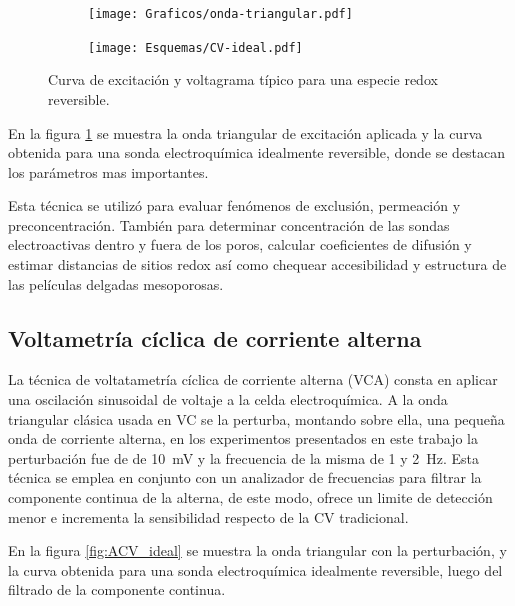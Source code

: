 	 			 \begin{figure}[h!]
			  		  \begin{subfigure}[t]{0.495\textwidth}
			  		  \texttt{[image: Graficos/onda-triangular.pdf]}
			  		  \end{subfigure}
			  		  \begin{subfigure}[t]{0.495\textwidth}
			  		  \texttt{[image: Esquemas/CV-ideal.pdf]}
			  		  \end{subfigure}
			  		  \caption[Voltamperometria ideal reversible]{Curva de excitación y voltagrama típico para una especie redox reversible.}
			  		  \label{fig:CV_ideal}
			  		  \end{figure}

	 		En la figura \ref{fig:CV_ideal} se muestra la onda triangular de excitación aplicada y la curva obtenida para una sonda electroquímica idealmente reversible, donde se destacan los parámetros mas importantes.
	 		
	 		Esta técnica se utilizó para evaluar fenómenos de exclusión, permeación y preconcentración. También para determinar concentración de las sondas electroactivas dentro y fuera de los poros, calcular coeficientes de difusión y estimar distancias de sitios redox así como chequear accesibilidad y estructura de las películas delgadas mesoporosas.


	 		

	 \subsection{Voltametría cíclica de corriente alterna}

	 		La técnica de voltatametría cíclica de corriente alterna (VCA) consta en aplicar una oscilación sinusoidal de voltaje a la celda electroquímica. A la onda triangular clásica usada en VC se la perturba, montando sobre ella, una pequeña onda de corriente alterna, en los experimentos presentados en este trabajo la perturbación fue de de \SI{10}{\milli\volt} y la frecuencia de la misma de 1 y \SI{2}{\hertz}. Esta técnica se emplea en conjunto con un analizador de frecuencias para filtrar la componente continua de la alterna, de este modo, ofrece un limite de detección menor e incrementa la sensibilidad respecto de la CV tradicional.\cite{Wi2000,Skoog1995}

	 		En la figura \ref{fig:ACV_ideal} se muestra la onda triangular con la perturbación, y la curva obtenida para una sonda electroquímica idealmente reversible, luego del filtrado de la componente continua.

